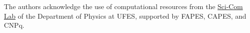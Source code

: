 \documentclass[twocolumn,linenumbers]{aastex701}
\begin{document}
\begin{acknowledgments}
The authors acknowledge the use of computational resources from the
\href{https://computacaocientifica.ufes.br/scicom}{Sci-Com Lab} of the
Department of Physics at UFES, supported by FAPES, CAPES, and CNPq.
\end{acknowledgments}




\end{document}
